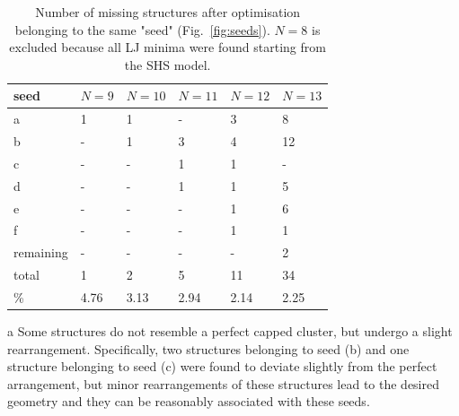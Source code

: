 %
%
\begin{table}\centering
    \begin{threeparttable}
    \caption{Number of missing structures after optimisation belonging to the
    same "seed" (Fig.\ \ref{fig:seeds}). $N=8$ is excluded because all LJ minima were
    found starting from the \acs{SHS} model.}
    \label{tab:seeds}
    \begin{tabular}{llllll}\toprule
        seed      & $N=9$   & $N=10$  & $N=11$  & $N=12$  & $N=13$  \\ \midrule
        a         & 1    & 1    & -    & 3    & 8    \\
        b         & -    & 1    & 3    & 4    & 12\tnote{a}   \\
        c         & -    & -    & 1    & 1\tnote{a}    & -    \\
        d         & -    & -    & 1    & 1    & 5    \\
        e         & -    & -    & -    & 1    & 6    \\
        f         & -    & -    & -    & 1    & 1    \\
        remaining & -    & -    & -    & -    & 2    \\ 
        total     & 1    & 2    & 5    & 11   & 34   \\
        \%        & 4.76 & 3.13 & 2.94 & 2.14 & 2.25 \\ \bottomrule
    \end{tabular}
        \begin{tablenotes}
        \item[a]{Some structures do not resemble a perfect capped
        cluster, but undergo a slight rearrangement. Specifically, two structures belonging to seed (b) and one structure belonging to seed (c) were found to deviate slightly from the perfect arrangement, but minor rearrangements of these structures lead to the desired geometry and they can be reasonably associated with these seeds.}
        \end{tablenotes}
    \end{threeparttable}
\end{table}%
%
%
